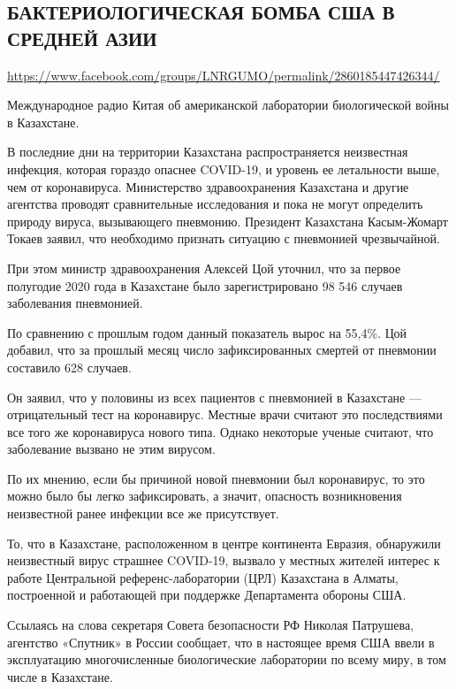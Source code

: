  
 
\subsection{БАКТЕРИОЛОГИЧЕСКАЯ БОМБА США В СРЕДНЕЙ АЗИИ}
\label{sec:19_07_2020.fb.lnr.4}
\url{https://www.facebook.com/groups/LNRGUMO/permalink/2860185447426344/}
  

Международное радио Китая об американской лаборатории биологической войны в
Казахстане.

В последние дни на территории Казахстана распространяется неизвестная инфекция,
которая гораздо опаснее COVID-19, и уровень ее летальности выше, чем от
коронавируса. Министерство здравоохранения Казахстана и другие агентства
проводят сравнительные исследования и пока не могут определить природу вируса,
вызывающего пневмонию.  Президент Казахстана Касым-Жомарт Токаев заявил, что
необходимо признать ситуацию с пневмонией чрезвычайной.

При этом министр здравоохранения Алексей Цой уточнил, что за первое полугодие
2020 года в Казахстане было зарегистрировано 98 546 случаев заболевания
пневмонией.

По сравнению с прошлым годом данный показатель вырос на 55,4\%.  Цой добавил,
что за прошлый месяц число зафиксированных смертей от пневмонии составило 628
случаев.

Он заявил, что у половины из всех пациентов с пневмонией в Казахстане ---
отрицательный тест на коронавирус.  Местные врачи считают это последствиями все
того же коронавируса нового типа. Однако некоторые ученые считают, что
заболевание вызвано не этим вирусом.

По их мнению, если бы причиной новой пневмонии был коронавирус, то это можно
было бы легко зафиксировать, а значит, опасность возникновения неизвестной
ранее инфекции все же присутствует.

То, что в Казахстане, расположенном в центре континента Евразия, обнаружили
неизвестный вирус страшнее COVID-19, вызвало у местных жителей интерес к работе
Центральной референс-лаборатории (ЦРЛ) Казахстана в Алматы, построенной и
работающей при поддержке Департамента обороны США.

Ссылаясь на слова секретаря Совета безопасности РФ Николая Патрушева, агентство
«Спутник» в России сообщает, что в настоящее время США ввели в эксплуатацию
многочисленные биологические лаборатории по всему миру, в том числе в
Казахстане.

